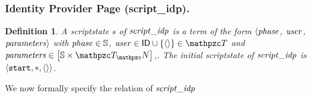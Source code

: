 \documentclass[letterpaper,onecolumn,10pt]{article}
\newtheorem{definition}{Definition}
\begin{document}
\begin{algorithmic}[1]
  \ENDIF
\ENDCASE
{}
    \ENDIF
  \ENDIF
\ENDCASE
\ENDSWITCH\\
\end{algorithmic}\setlength{\parindent}{1em}

\subsubsection{Identity Provider Page (script\_idp).}\label{app:uppresso-script-Idp}

\begin{definition}\label{def:scriptstateidp}
  A \emph{scriptstate $s$ of $\mathit{script\_idp}$} is a term of the form
  $\langle \mathit{phase}$, $\mathit{user}$, $\mathit{parameters} \rangle$ with $\mathit{phase} \in
  \mathbb{S}$, $\mi{user} \in \IDs \cup \{\an{}\} \in \gterms$ and $\mi{parameters} \in \dict{\mathbb{S}}{\terms}$,. The 
  \emph{initial scriptstate} of $\mathit{script\_idp}$ is $\langle\mathtt{start},*,\langle {{}\rangle} \rangle$.
\end{definition}

We now formally specify the relation of $\mathit{script\_idp}$
\end{document}
